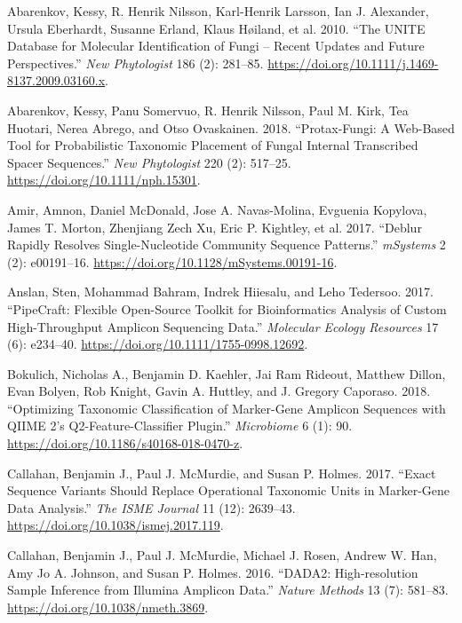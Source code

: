 \documentclass[
]{article}
\newlength{\cslhangindent}
\newenvironment{CSLReferences}[2] %
 {\begin{list}{}{%
  \setlength{\itemindent}{0pt}
  \setlength{\leftmargin}{0pt}
  \setlength{\parsep}{0pt}
  \ifodd #1
   \setlength{\leftmargin}{\cslhangindent}
   \setlength{\itemindent}{-1\cslhangindent}
  \fi
  \setlength{\itemsep}{#2\baselineskip}}}
 {\end{list}}
\begin{document}
\label{refs}
\begin{CSLReferences}{1}{0}
Abarenkov, Kessy, R. Henrik Nilsson, Karl-Henrik Larsson, Ian J. Alexander, Ursula Eberhardt, Susanne Erland, Klaus Høiland, et al. 2010. {``The {UNITE} Database for Molecular Identification of Fungi -- Recent Updates and Future Perspectives.''} \emph{New Phytologist} 186 (2): 281--85. \url{https://doi.org/10.1111/j.1469-8137.2009.03160.x}.

Abarenkov, Kessy, Panu Somervuo, R. Henrik Nilsson, Paul M. Kirk, Tea Huotari, Nerea Abrego, and Otso Ovaskainen. 2018. {``Protax-Fungi: A Web-Based Tool for Probabilistic Taxonomic Placement of Fungal Internal Transcribed Spacer Sequences.''} \emph{New Phytologist} 220 (2): 517--25. \url{https://doi.org/10.1111/nph.15301}.

Amir, Amnon, Daniel McDonald, Jose A. Navas-Molina, Evguenia Kopylova, James T. Morton, Zhenjiang Zech Xu, Eric P. Kightley, et al. 2017. {``Deblur {Rapidly Resolves Single-Nucleotide Community Sequence Patterns}.''} \emph{mSystems} 2 (2): e00191--16. \url{https://doi.org/10.1128/mSystems.00191-16}.

Anslan, Sten, Mohammad Bahram, Indrek Hiiesalu, and Leho Tedersoo. 2017. {``{PipeCraft}: {Flexible} Open-Source Toolkit for Bioinformatics Analysis of Custom High-Throughput Amplicon Sequencing Data.''} \emph{Molecular Ecology Resources} 17 (6): e234--40. \url{https://doi.org/10.1111/1755-0998.12692}.

Bokulich, Nicholas A., Benjamin D. Kaehler, Jai Ram Rideout, Matthew Dillon, Evan Bolyen, Rob Knight, Gavin A. Huttley, and J. Gregory Caporaso. 2018. {``Optimizing Taxonomic Classification of Marker-Gene Amplicon Sequences with {QIIME} 2's Q2-Feature-Classifier Plugin.''} \emph{Microbiome} 6 (1): 90. \url{https://doi.org/10.1186/s40168-018-0470-z}.

Callahan, Benjamin J., Paul J. McMurdie, and Susan P. Holmes. 2017. {``Exact Sequence Variants Should Replace Operational Taxonomic Units in Marker-Gene Data Analysis.''} \emph{The ISME Journal} 11 (12): 2639--43. \url{https://doi.org/10.1038/ismej.2017.119}.

Callahan, Benjamin J., Paul J. McMurdie, Michael J. Rosen, Andrew W. Han, Amy Jo A. Johnson, and Susan P. Holmes. 2016. {``{DADA2}: {High-resolution} Sample Inference from {Illumina} Amplicon Data.''} \emph{Nature Methods} 13 (7): 581--83. \url{https://doi.org/10.1038/nmeth.3869}.


\end{CSLReferences}
\end{document}

